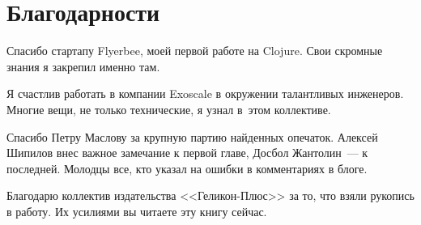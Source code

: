 \section*{Благодарности}

Спасибо стартапу Flyerbee, моей первой работе на Clojure. Свои скромные знания я
закрепил именно там.

Я счастлив работать в компании Exoscale в окружении талантливых
инженеров. Многие вещи, не только технические, я узнал в~этом коллективе.

Спасибо Петру Маслову за крупную партию найденных опечаток. Алексей Шипилов внес
важное замечание к первой главе, Досбол Жантолин~--- к последней. Молодцы все,
кто указал на ошибки в комментариях в блоге.

Благодарю коллектив издательства <<Геликон-Плюс>> за то, что взяли рукопись в
работу. Их усилиями вы читаете эту книгу сейчас.
